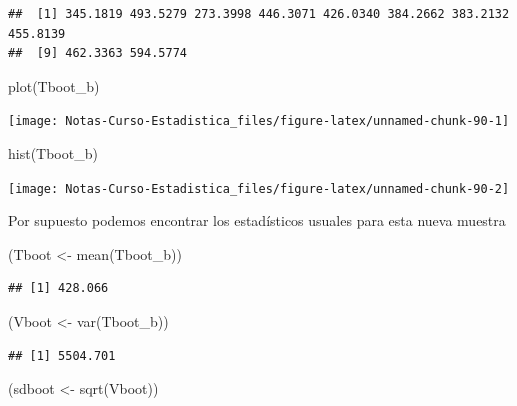 \documentclass[
  12pt,
]{book}
\newenvironment{Shaded}{\begin{snugshade}}{\end{snugshade}}
\newcommand{\FunctionTok}[1]{\textcolor[rgb]{0.00,0.00,0.00}{#1}}
\newcommand{\NormalTok}[1]{#1}
\newcommand{\OtherTok}[1]{\textcolor[rgb]{0.56,0.35,0.01}{#1}}
\begin{document}
\begin{verbatim}
##  [1] 345.1819 493.5279 273.3998 446.3071 426.0340 384.2662 383.2132 455.8139
##  [9] 462.3363 594.5774
\end{verbatim}

\begin{Shaded}
\begin{Highlighting}[]
\FunctionTok{plot}\NormalTok{(Tboot\_b)}
\end{Highlighting}
\end{Shaded}

\begin{center}\texttt{[image: Notas-Curso-Estadistica\_files/figure-latex/unnamed-chunk-90-1]} \end{center}

\begin{Shaded}
\begin{Highlighting}[]
\FunctionTok{hist}\NormalTok{(Tboot\_b)}
\end{Highlighting}
\end{Shaded}

\begin{center}\texttt{[image: Notas-Curso-Estadistica\_files/figure-latex/unnamed-chunk-90-2]} \end{center}

Por supuesto podemos encontrar los estadísticos usuales para esta nueva
muestra

\begin{Shaded}
\begin{Highlighting}[]
\NormalTok{(Tboot }\OtherTok{\textless{}{-}} \FunctionTok{mean}\NormalTok{(Tboot\_b))}
\end{Highlighting}
\end{Shaded}

\begin{verbatim}
## [1] 428.066
\end{verbatim}

\begin{Shaded}
\begin{Highlighting}[]
\NormalTok{(Vboot }\OtherTok{\textless{}{-}} \FunctionTok{var}\NormalTok{(Tboot\_b))}
\end{Highlighting}
\end{Shaded}

\begin{verbatim}
## [1] 5504.701
\end{verbatim}

\begin{Shaded}
\begin{Highlighting}[]
\NormalTok{(sdboot }\OtherTok{\textless{}{-}} \FunctionTok{sqrt}\NormalTok{(Vboot))}
\end{Highlighting}
\end{Shaded}
\end{document}
